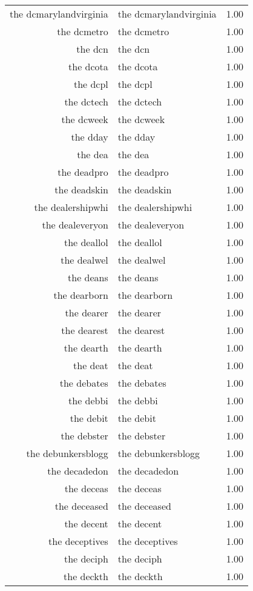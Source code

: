 \begin{table}[ht]
\begin{tabular}{rlr}
  the dcmarylandvirginia & the dcmarylandvirginia & 1.00 \\ 
  the dcmetro & the dcmetro & 1.00 \\ 
  the dcn & the dcn & 1.00 \\ 
  the dcota & the dcota & 1.00 \\ 
  the dcpl & the dcpl & 1.00 \\ 
  the dctech & the dctech & 1.00 \\ 
  the dcweek & the dcweek & 1.00 \\ 
  the dday & the dday & 1.00 \\ 
  the dea & the dea & 1.00 \\ 
  the deadpro & the deadpro & 1.00 \\ 
  the deadskin & the deadskin & 1.00 \\ 
  the dealershipwhi & the dealershipwhi & 1.00 \\ 
  the dealeveryon & the dealeveryon & 1.00 \\ 
  the deallol & the deallol & 1.00 \\ 
  the dealwel & the dealwel & 1.00 \\ 
  the deans & the deans & 1.00 \\ 
  the dearborn & the dearborn & 1.00 \\ 
  the dearer & the dearer & 1.00 \\ 
  the dearest & the dearest & 1.00 \\ 
  the dearth & the dearth & 1.00 \\ 
  the deat & the deat & 1.00 \\ 
  the debates & the debates & 1.00 \\ 
  the debbi & the debbi & 1.00 \\ 
  the debit & the debit & 1.00 \\ 
  the debster & the debster & 1.00 \\ 
  the debunkersblogg & the debunkersblogg & 1.00 \\ 
  the decadedon & the decadedon & 1.00 \\ 
  the deceas & the deceas & 1.00 \\ 
  the deceased & the deceased & 1.00 \\ 
  the decent & the decent & 1.00 \\ 
  the deceptives & the deceptives & 1.00 \\ 
  the deciph & the deciph & 1.00 \\ 
  the deckth & the deckth & 1.00 \\ 

\end{tabular}
\end{table}
